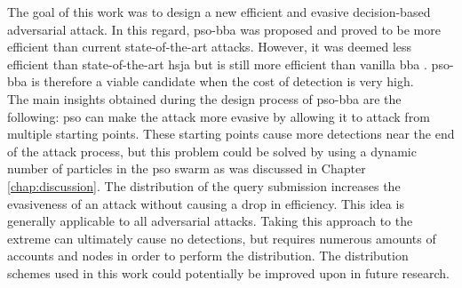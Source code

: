 %
%

The goal of this work was to design a new efficient and evasive decision-based adversarial attack. In this regard, \gls{pso}-\gls{bba} was proposed and proved to be more efficient than current state-of-the-art attacks. However, it was deemed less efficient than state-of-the-art \gls{hsja} \cite{hsja} but is still more efficient than vanilla \gls{bba} \cite{brunner_guessing_2019}. \gls{pso}-\gls{bba} is therefore a viable candidate when the cost of detection is very high.\\

The main insights obtained during the design process of \gls{pso}-\gls{bba} are the following: \gls{pso} can make the attack more evasive by allowing it to attack from multiple starting points. These starting points cause more detections near the end of the attack process, but this problem could be solved by using a dynamic number of particles in the \gls{pso} swarm as was discussed in Chapter \ref{chap:discussion}. The distribution of the query submission increases the evasiveness of an attack without causing a drop in efficiency. This idea is generally applicable to all adversarial attacks. Taking this approach to the extreme can ultimately cause no detections, but requires numerous amounts of accounts and nodes in order to perform the distribution. The distribution schemes used in this work could potentially be improved upon in future research.\\

